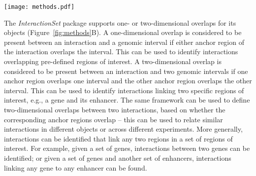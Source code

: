 \documentclass[10pt,a4paper,twocolumn]{article}
\begin{document}
\begin{figure*}
\centering
\texttt{[image: methods.pdf]}
\caption{Schematic of several methods in the \textit{InteractionSet} package.
(A) Minimum bounding boxes can be identified for groups of interactions using the  method.
Here, $u'$, $v'$ and $w'$ belong in one group while $x'$, $y'$ and $z'$ belong in another.
(B) One- or two-dimensional overlaps can be identified between interactions and one or two genomic intervals, respectively, using the  method.
Here, $x'$ and $y'$ have one-dimensional overlaps with the gene and enhancer, respectively, while $z'$ has a two-dimensional overlap with the gene \textit{and} the enhancer.
(C) An  object contains data -- in this case, read pair count data -- for interactions in the two-dimensional interaction space.
Given a bait region, a ``cross-section'' of the space can be extracted and converted into a  object using the  method.
This object holds count data for intervals on the linear genome (blue lines) where the count for each interval describes the strength of the interaction between that interval and the bait.
This format effectively mimics that of 4C data.
}
\label{fig:methods}
\end{figure*}

The \textit{InteractionSet} package supports one- or two-dimensional overlaps for its objects (Figure~\ref{fig:methods}B).
A one-dimensional overlap is considered to be present between an interaction and a genomic interval if either anchor region of the interaction overlaps the interval.
This can be used to identify interactions overlapping pre-defined regions of interest.
A two-dimensional overlap is considered to be present between an interaction and two genomic intervals if one anchor region overlaps one interval and the other anchor region overlaps the other interval.
This can be used to identify interactions linking two specific regions of interest, e.g., a gene and its enhancer.
The same framework can be used to define two-dimensional overlaps between two interactions, based on whether the corresponding anchor regions overlap -- this can be used to relate similar interactions in different  objects or across different experiments.
More generally, interactions can be identified that link any two regions in a set of regions of interest. 
For example, given a set of genes, interactions between two genes can be identified; or given a set of genes and another set of enhancers, interactions linking any gene to any enhancer can be found.
\end{document}
